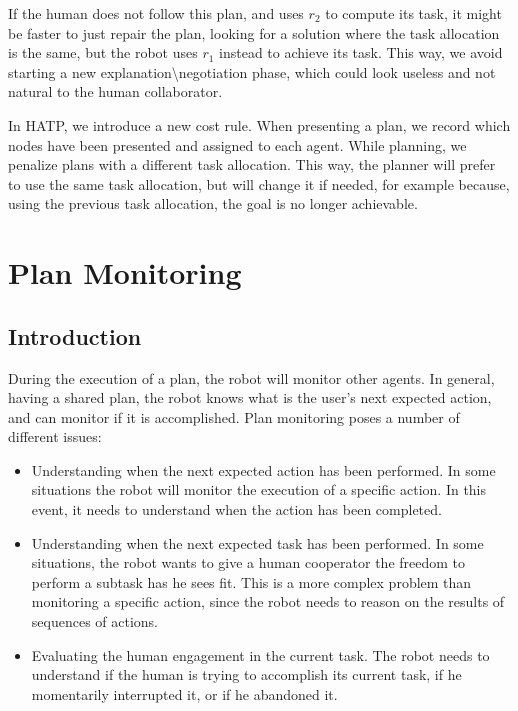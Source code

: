 If the human does not follow this plan, and uses $r_2$ to compute its task,  it might be faster to just repair the plan, looking for a solution where the task allocation is the same, but the robot uses $r_1$ instead to achieve its task. This way, we avoid starting a new explanation\textbackslash negotiation phase, which could look useless and not natural to the human collaborator.


In HATP, we introduce a new cost rule. When presenting a plan, we record which nodes have been presented and assigned to each agent. While planning, we penalize plans with a different task allocation. This way, the planner will prefer to use the same task allocation, but will change it if needed, for example because, using the previous task allocation, the goal is no longer achievable.



\section{Plan Monitoring}
\label{section:plan_management-plan_monitoring}

\subsection{Introduction}
During the execution of a plan, the robot will monitor other agents. In general, having a shared plan, the robot knows what is the user's next expected action, and can monitor if it is accomplished. Plan monitoring poses a number of different issues:
\begin{itemize}
\item Understanding when the next expected action has been performed. In some situations the robot will monitor the execution of a specific action. In this event, it needs to understand when the action has been completed.
\item Understanding when the next expected task has been performed. In some situations, the robot wants to give a human cooperator the freedom to perform a subtask has he sees fit. This is a more complex problem than monitoring a specific action, since the robot needs to reason on the results of sequences of actions.
\item Evaluating the human engagement in the current task. The robot needs to understand if the human is trying to accomplish its current task, if he momentarily interrupted it, or if he abandoned it.
\end{itemize}

